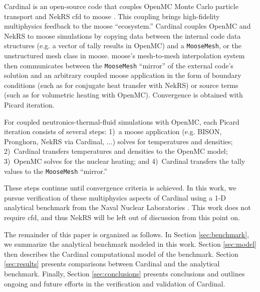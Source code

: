 \documentclass[letterpaper]{mc2023}
\begin{document}
Cardinal \cite{novak2022_cardinal} is an open-source code  that couples OpenMC \cite{openmc} Monte Carlo particle transport and
NekRS \gls{cfd} to \gls{moose} \cite{lindsay2022moose}. This coupling brings high-fidelity multiphysics feedback to the \gls{moose}
``ecosystem.'' Cardinal couples OpenMC and NekRS to \gls{moose} simulations by copying data between the internal code data structures
(e.g. a vector of tally results in OpenMC) and a \texttt{MooseMesh}, or the unstructured mesh class in \gls{moose}. \gls{moose}'s
mesh-to-mesh interpolation system then communicates between the \texttt{MooseMesh} ``mirror'' of the external code's solution and an
arbitrary coupled \gls{moose} application in the form of boundary conditions (such as for conjugate heat transfer with NekRS) or
source terms (such as for volumetric heating with OpenMC). Convergence is obtained with Picard iteration.

For coupled neutronics-thermal-fluid simulations with OpenMC, each Picard iteration consists of several steps: 1)~a \gls{moose}
application (e.g. BISON, Pronghorn, NekRS via Cardinal, ...) solves for temperatures and densities; 2)~Cardinal transfers
temperatures and densities to the OpenMC model; 3)~OpenMC solves for the nuclear heating; and 4)~Cardinal transfers the tally
values to the \texttt{MooseMesh} ``mirror.''

These steps continue until convergence criteria is achieved. In this work, we pursue verification of these multiphysics aspects
of Cardinal using a 1-D analytical benchmark from the Naval Nuclear Laboratories \cite{analytical_benchmark}.  This work does
not require \gls{cfd}, and thus NekRS will be left out of discussion from this point on.

The remainder of this paper is organized as follows. In Section \ref{sec:benchmark}, we summarize the analytical benchmark
modeled in this work. Section \ref{sec:model} then describes the Cardinal computational model of the benchmark. Section
\ref{sec:results} presents comparisons between Cardinal and the analytical benchmark. Finally, Section \ref{sec:conclusions}
presents conclusions and outlines ongoing and future efforts in the verification and validation of Cardinal.
\end{document}
